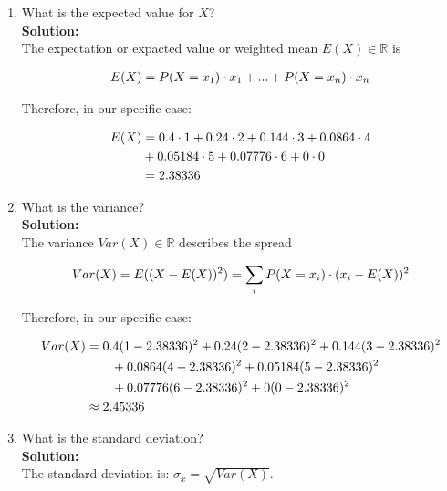 \documentclass[a4paper]{article}
\begin{document}
\begin{enumerate}
\begin{enumerate}
	
	\item What is the expected value for $X$?\\
	\textbf{Solution:}\\
	
	
The expectation or expacted value or weighted mean $E(X) \in \mathbb{R}$ is

\begin{align}
	E(X) = P(X = x_1) \cdot x_1 + ... + P(X = x_n) \cdot x_n\notag
\end{align}	

Therefore, in our specific case:

\begin{align}
	E(X) &= 0.4 \cdot 1 + 0.24 \cdot 2 + 0.144 \cdot 3 + 0.0864 \cdot 4\notag\\
	 &+ 0.05184 \cdot 5 + 0.07776 \cdot 6 + 0 \cdot 0\notag\\
	 &= 2.38336\notag
\end{align}
	
	
	
	\item What is the variance?\\
	\textbf{Solution:}\\
	
The variance $Var(X) \in \mathbb{R}$ describes the spread

\begin{align}
	Var(X) = E((X - E(X))^2) = \sum_i P(X = x_i) \cdot (x_i - E(X))^2\notag
\end{align}	
	
Therefore, in our specific case:

\begin{align}
	Var(X) &= 0.4(1 - 2.38336)^2 + 0.24(2 - 2.38336)^2 + 0.144(3 - 2.38336)^2\notag\\
	& \qquad + 0.0864(4 - 2.38336)^2 + 0.05184(5 - 2.38336)^2\notag\\
	& \qquad + 0.07776(6 - 2.38336)^2 + 0(0 - 2.38336)^2\notag\\
	&\approx 2.45336\notag
\end{align}	
	
	


	\item What is the standard deviation?\\
	\textbf{Solution:}\\
	
The standard deviation is: $\sigma_x = \sqrt{Var(X)}$.



\end{enumerate}
\end{enumerate}
\end{document}
